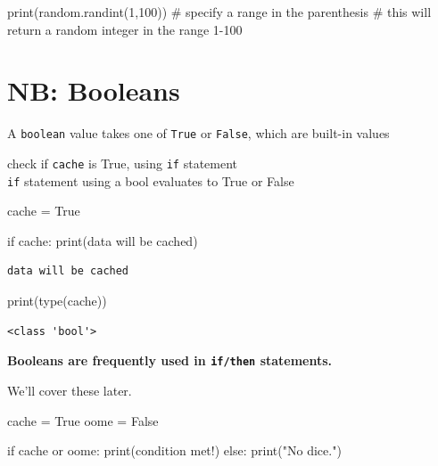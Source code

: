 \documentclass[
  letterpaper,
  DIV=11,
  numbers=noendperiod]{scrreprt}
\newenvironment{Shaded}{\begin{snugshade}}{\end{snugshade}}
\newcommand{\BuiltInTok}[1]{\textcolor[rgb]{0.00,0.23,0.31}{#1}}
\newcommand{\CommentTok}[1]{\textcolor[rgb]{0.37,0.37,0.37}{#1}}
\newcommand{\ControlFlowTok}[1]{\textcolor[rgb]{0.00,0.23,0.31}{#1}}
\newcommand{\DecValTok}[1]{\textcolor[rgb]{0.68,0.00,0.00}{#1}}
\newcommand{\KeywordTok}[1]{\textcolor[rgb]{0.00,0.23,0.31}{#1}}
\newcommand{\NormalTok}[1]{\textcolor[rgb]{0.00,0.23,0.31}{#1}}
\newcommand{\OperatorTok}[1]{\textcolor[rgb]{0.37,0.37,0.37}{#1}}
\newcommand{\StringTok}[1]{\textcolor[rgb]{0.13,0.47,0.30}{#1}}
\newcommand{\VariableTok}[1]{\textcolor[rgb]{0.07,0.07,0.07}{#1}}
\begin{document}
\begin{Shaded}
\begin{Highlighting}[]
\BuiltInTok{print}\NormalTok{(random.randint(}\DecValTok{1}\NormalTok{,}\DecValTok{100}\NormalTok{)) }\CommentTok{\# specify a range in the parenthesis}
    \CommentTok{\# this will return a random integer in the range 1{-}100}
\end{Highlighting}
\end{Shaded}

\hypertarget{nb-booleans}{%
\chapter{NB: Booleans}\label{nb-booleans}}

A \texttt{boolean} value takes one of \texttt{True} or \texttt{False},
which are built-in values

check if \texttt{cache} is True, using \texttt{if} statement\\
\texttt{if} statement using a bool evaluates to True or False

\begin{Shaded}
\begin{Highlighting}[]
\NormalTok{cache }\OperatorTok{=} \VariableTok{True}

\ControlFlowTok{if}\NormalTok{ cache:}
   \BuiltInTok{print}\NormalTok{(}\StringTok{\textquotesingle{}data will be cached\textquotesingle{}}\NormalTok{)}
\end{Highlighting}
\end{Shaded}

\begin{verbatim}
data will be cached
\end{verbatim}

\begin{Shaded}
\begin{Highlighting}[]
\BuiltInTok{print}\NormalTok{(}\BuiltInTok{type}\NormalTok{(cache))}
\end{Highlighting}
\end{Shaded}

\begin{verbatim}
<class 'bool'>
\end{verbatim}

\textbf{Booleans are frequently used in \texttt{if/then} statements.}

We'll cover these later.

\begin{Shaded}
\begin{Highlighting}[]
\NormalTok{cache }\OperatorTok{=} \VariableTok{True}
\NormalTok{oome }\OperatorTok{=} \VariableTok{False}

\ControlFlowTok{if}\NormalTok{ cache }\KeywordTok{or}\NormalTok{ oome:}
    \BuiltInTok{print}\NormalTok{(}\StringTok{\textquotesingle{}condition met!\textquotesingle{}}\NormalTok{)}
\ControlFlowTok{else}\NormalTok{:}
    \BuiltInTok{print}\NormalTok{(}\StringTok{"No dice."}\NormalTok{)}
\end{Highlighting}
\end{Shaded}
\end{document}
